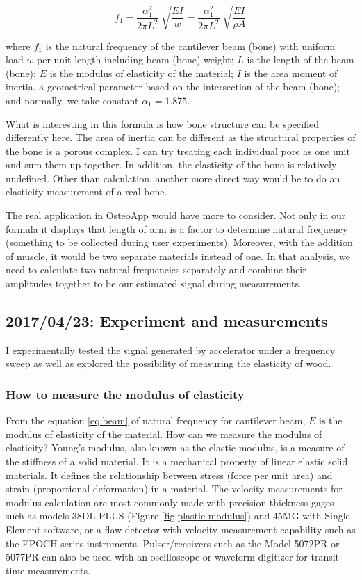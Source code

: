 \documentclass{sigchi}
\begin{document}
\begin{equation} \label{eq:beam}
f_1=\frac{\alpha_1^2}{2\pi L^2}\sqrt[]{\frac{EI}{w}}=\frac{\alpha_1^2}{2\pi L^2}\sqrt[]{\frac{EI}{\rho A}}
\end{equation}

where $f_1$ is the natural frequency of the cantilever beam (bone) with uniform load $w$ per unit length including beam (bone) weight; $L$ is the length of the beam (bone); $E$ is the modulus of elasticity of the material; $I$ is the area moment of inertia, a geometrical parameter based on the intersection of the beam (bone); and normally, we take constant $\alpha_1 = 1.875$.

What is interesting in this formula is how bone structure can be specified differently here. The area of inertia can be different as the structural properties of the bone is a porous complex. I can try treating each individual pore as one unit and sum them up together. In addition, the elasticity of the bone is relatively undefined. Other than calculation, another more direct way would be to do an elasticity measurement of a real bone. 
 
The real application in OsteoApp would have more to consider. Not only in our formula it displays that length of arm is a factor to determine natural frequency (something to be collected during user experiments). Moreover, with the addition of muscle, it would be two separate materials instead of one. In that analysis, we need to calculate two natural frequencies separately and combine their amplitudes together to be our estimated signal during measurements. 

\subsection{2017/04/23: Experiment and measurements}

I experimentally tested the signal generated by accelerator under a frequency sweep as well as explored the possibility of measuring the elasticity of wood. 

\subsubsection{How to measure the modulus of elasticity} 

From the equation \eqref{eq:beam} of natural frequency for cantilever beam, $E$ is the modulus of elasticity of the material. How can we measure the modulus of elasticity? Young's modulus, also known as the elastic modulus, is a measure of the stiffness of a solid material. It is a mechanical property of linear elastic solid materials. It defines the relationship between stress (force per unit area) and strain (proportional deformation) in a material. The velocity measurements for modulus calculation are most commonly made with precision thickness gages such as models 38DL PLUS (Figure \ref{fig:plastic-modulus}) and 45MG with Single Element software,  or a flaw detector with velocity measurement capability such as the EPOCH series instruments. Pulser/receivers such as the Model 5072PR or 5077PR can also be used with an oscilloscope or waveform digitizer for transit time measurements. 
\end{document}
